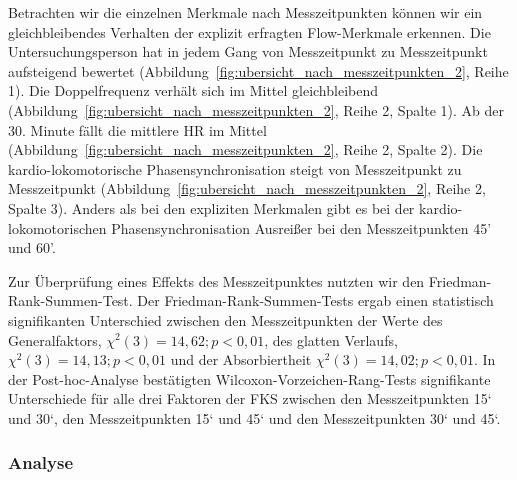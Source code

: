Betrachten wir die einzelnen Merkmale nach Messzeitpunkten können wir ein gleichbleibendes Verhalten der explizit erfragten Flow-Merkmale erkennen. Die Untersuchungsperson hat in jedem Gang von Messzeitpunkt zu Messzeitpunkt aufsteigend bewertet (Abbildung~\ref{fig:ubersicht_nach_messzeitpunkten_2}, Reihe 1). Die Doppelfrequenz verhält sich im Mittel gleichbleibend (Abbildung~\ref{fig:ubersicht_nach_messzeitpunkten_2}, Reihe 2, Spalte 1). Ab der 30. Minute fällt die mittlere \ac{HR} im Mittel (Abbildung~\ref{fig:ubersicht_nach_messzeitpunkten_2}, Reihe 2, Spalte 2). Die kardio-lokomotorische Phasensynchronisation steigt von Messzeitpunkt zu Messzeitpunkt (Abbildung~\ref{fig:ubersicht_nach_messzeitpunkten_2}, Reihe 2, Spalte 3). Anders als bei den expliziten Merkmalen gibt es bei der kardio-lokomotorischen Phasensynchronisation Ausreißer bei den Messzeitpunkten 45' und 60'. 

Zur Überprüfung eines Effekts des Messzeitpunktes nutzten wir den Friedman-Rank-Summen-Test. Der Friedman-Rank-Summen-Tests ergab einen statistisch signifikanten Unterschied zwischen den Messzeitpunkten der Werte des Generalfaktors, $\chi^2 (3) = 14{,}62; p < 0{,}01$, des glatten Verlaufs, $\chi^2 (3) = 14{,}13; p < 0{,}01$ und der Absorbiertheit $\chi^2 (3) = 14{,}02; p < 0{,}01$. In der Post-hoc-Analyse bestätigten Wilcoxon-Vorzeichen-Rang-Tests signifikante Unterschiede für alle drei Faktoren der \ac{FKS} zwischen den Messzeitpunkten 15‘ und 30‘, den Messzeitpunkten 15‘ und 45‘ und den Messzeitpunkten 30‘ und 45‘. 

\subsubsection{Analyse} 

